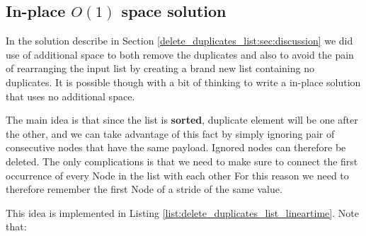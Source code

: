 \subsection{In-place $O(1)$ space solution}
\label{delete_duplicates_list:sec:linear_space}
In the solution describe in Section \ref{delete_duplicates_list:sec:discussion} we did use of additional space to both remove the duplicates and also to avoid the pain of rearranging the input list by creating a brand new list containing no duplicates. It is possible though with a bit of thinking to write a in-place solution that uses no additional space. 

The main idea is that since the list is \textbf{sorted}, duplicate element will be one after the other, and we can take advantage of this fact by simply ignoring pair of consecutive nodes that have the same payload. Ignored nodes can therefore be deleted. The only complications is that we need to make sure to connect the first occurrence of every Node in the list with each other For this reason we need to therefore remember the first Node of a stride of the same value.

This idea is implemented in Listing \ref{list:delete_duplicates_list_lineartime}. Note that:

